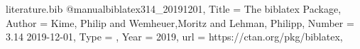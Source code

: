 % 
%
% 
%               
%          
%
% 


\begin{filecontents*}{literature.bib}
@manual{biblatex314_20191201,
  Title                    = {The biblatex Package},
  Author                   = {Kime, Philip and Wemheuer,Moritz and Lehman, Philipp},
  Number                   = {3.14 2019-12-01},
  Type                     = {},
  Year                     = {2019},
  url                      = {https://ctan.org/pkg/biblatex},
}
\end{filecontents*}


\documentclass[%
  type=article,%
  layout=koma,%
  bibliography=false,%
  cleveref=true,%
  conditionallox=true,%
  conditionalloxnewpage=false,%
  date=true,%
  hyperref=true,%
  index=true,%
  listings=true%
]{stmtext}



